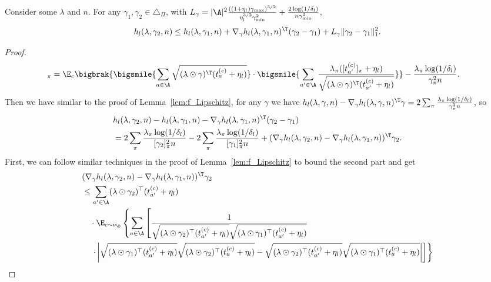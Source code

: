 \documentclass{article}
\newcommand{\1}{\mathbf{1}}
\begin{document}
\begin{lemma}\label{lem:gamma_Lipschitz}
Consider some $\lambda$ and $n$. For any $\gamma_1,\gamma_2\in\triangle_\Pi$, with $L_{\gamma}=|\A|^2\frac{((1+\eta_l)\gamma_{\max})^{3/2}}{\eta_l^{3/2}\gamma_{\min}^2}+\frac{2\log(1/\delta_l)}{n\gamma_{\min}^3}$,
\[h_l(\lambda,\gamma_2,n)\leq h_l(\lambda,\gamma_1,n)+\nabla_\gamma h_l(\lambda,\gamma_1,n)^\T (\gamma_2-\gamma_1)+L_{\gamma}\|\gamma_2-\gamma_1\|_1^2. \]
\end{lemma}
\begin{proof}
{
\small
\begin{align*}
    [\nabla_\gamma h_l(\lambda,\gamma)]_\pi &=\E_c\bigbrak{\bigsmile{\sum_{a\in\A}\sqrt{(\lambda\odot\gamma)^\T (t_a^{(c)}+\eta_l)}}\cdot\bigsmile{\sum_{a'\in\A}\frac{\lambda_\pi([t_{a'}^{(c)}]_\pi+\eta_l)}{\sqrt{(\lambda\odot\gamma)^\T (t_{a'}^{(c)}+\eta_l)}}}}-\frac{\lambda_\pi\log(1/\delta_l)}{\gamma_\pi^2 n}.
\end{align*}
}
Then we have similar to the proof of Lemma~\ref{lem:f_Lipschitz}, for any $\gamma$ we have  $h_l(\lambda,\gamma,n)-\nabla_\gamma h_l(\lambda,\gamma,n)^\T\gamma=2\sum_{\pi}\frac{\lambda_\pi\log(1/\delta_l)}{\gamma_\pi^2 n}$, so 
\begin{align*}
    &h_l(\lambda,\gamma_2,n)- h_l(\lambda,\gamma_1,n)-\nabla_\gamma h_l(\lambda,\gamma_1,n)^\T (\gamma_2-\gamma_1)\\
    &= 2\sum_{\pi}\frac{\lambda_\pi\log(1/\delta_l)}{[\gamma_2]_\pi^2 n}-2\sum_{\pi}\frac{\lambda_\pi\log(1/\delta_l)}{[\gamma_1]_\pi^2 n}+(\nabla_\gamma h_l(\lambda,\gamma_2,n)-\nabla_\gamma h_l(\lambda,\gamma_1,n))^\T \gamma_2.
\end{align*}
First, we can follow similar techniques in the proof of Lemma~\ref{lem:f_Lipschitz} to bound the second part and get
{
\small
\begin{align*}
    &(\nabla_\gamma h_l(\lambda,\gamma_2,n)-\nabla_\gamma h_l(\lambda,\gamma_1,n))^\T \gamma_2\\
    &\leq \sum_{a^{\prime} \in \A}(\lambda\odot\gamma_{2})^{\top} (t_{a^{\prime}}^{(c)}+\eta_l) \nonumber\\
    &\quad\cdot\E_{c\sim\nu_\D}\left\{\sum_{a \in \A} \left[\frac{1}{\sqrt{(\lambda\odot\gamma_{2})^{\top} (t_{a^{\prime}}^{(c)}+\eta_l)}\sqrt{(\lambda\odot\gamma_{1})^{\top} (t_{a^{\prime}}^{(c)}+\eta_l)}}\right.\right.\\
    &\left.\left.\quad\cdot\left|\sqrt{(\lambda\odot\gamma_{1})^{\top} (t_{a^{\prime}}^{(c)}+\eta_l)}\sqrt{(\lambda\odot\gamma_{2})^{\top} (t_{a}^{(c)}+\eta_l)}-\sqrt{(\lambda\odot\gamma_{2})^{\top} (t_{a'}^{(c)}+\eta_l)}\sqrt{(\lambda\odot\gamma_{1})^{\top} (t_{a}^{(c)}+\eta_l)}\right|\right]\right\}\nonumber\\

\end{align*}}
\end{proof}
\end{document}

